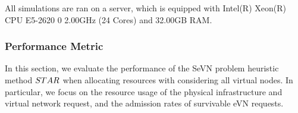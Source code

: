 All simulations are ran on a server, which is equipped with Intel(R) Xeon(R) CPU E5-2620 0 \@ 2.00GHz (24 Cores) and 32.00GB RAM.


\subsubsection{Performance Metric}
In this section, we evaluate the performance of the SeVN problem heuristic method $STAR$ when allocating resources with considering all virtual nodes. In particular, we focus on the resource usage of the physical infrastructure and virtual network request, and the admission rates of survivable eVN  requests.




